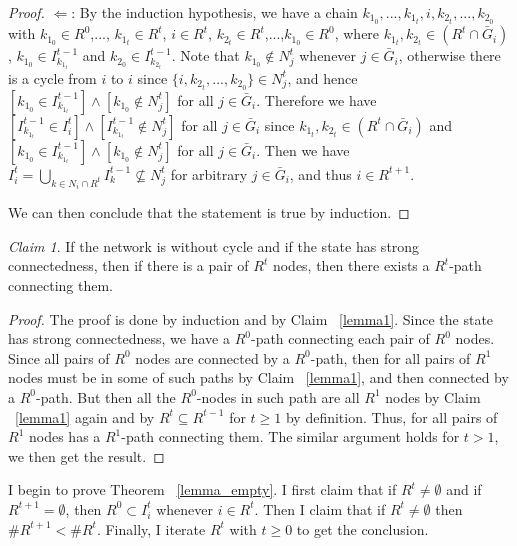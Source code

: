 \documentclass[12pt,letter]{article}
\theoremstyle{definition}
\theoremstyle{remark}
\theoremstyle{claim}
\newtheorem{claim}{Claim}
\begin{document}
\begin{proof}
$\Leftarrow$:
By the induction hypothesis, we have a chain $k_{1_0},...,k_{1_t},i,k_{2_t},...,k_{2_0}$ with $k_{1_0}\in R^0$,..., $k_{1_t}\in R^t$, $i\in R^t$, $k_{2_t}\in R^t$,...,$k_{1_0}\in R^0$, where $k_{1_t},k_{2_t}\in (R^{t}\cap \bar{G}_i)$, $k_{1_0}\in I^{t-1}_{k_{1_t}}$ and $k_{2_0}\in I^{t-1}_{k_{2_t}}$. Note that $k_{1_0}\notin N^t_j$ whenever $j\in \bar{G}_i$, otherwise there is a cycle from $i$ to $i$ since $\{i,k_{2_t},...,k_{2_0}\}\in N^t_j$, and hence $[k_{1_0}\in I^{t-1}_{k_{1_t}}] \wedge [k_{1_0}\notin N^t_j]$ for all $j\in \bar{G}_i$. Therefore we have $[I^{t-1}_{k_{1_t}}\in I^t_i] \wedge [I^{t-1}_{k_{1_t}}\notin N^t_j]$ for all $j\in \bar{G}_i$ since $k_{1_t},k_{2_t}\in (R^{t}\cap \bar{G}_i)$ and $[k_{1_0}\in I^{t-1}_{k_{1_t}}] \wedge [k_{1_0}\notin N^t_j]$ for all $j\in \bar{G}_i$. Then we have $I^t_i=\bigcup_{k\in N_i\cap R^{t}}I^{t-1}_k\nsubseteq N^t_j$ for arbitrary $j\in \bar{G}_i$, and thus $i\in R^{t+1}$.



We can then conclude that the statement is true by induction.




\end{proof}



\begin{claim}
\label{lemma_connected}
If the network  is without cycle and if the state has strong connectedness, then if there is a pair of $R^{t}$ nodes, then there exists a $R^{t}$-path connecting them.
\end{claim}
\begin{proof}
The proof is done by induction and by Claim ~\ref{lemma1}. Since the state has strong connectedness, we have a $R^0$-path connecting each pair of $R^0$ nodes. Since all pairs of $R^0$ nodes are connected by a $R^0$-path, then for all pairs of $R^1$ nodes must be in some of such paths by Claim ~\ref{lemma1}, and then connected by a $R^0$-path. But then all the $R^0$-nodes in such path are all $R^1$ nodes by Claim ~\ref{lemma1} again and by $R^t\subseteq R^{t-1}$ for $t\geq 1$ by definition. Thus, for all pairs of $R^1$ nodes has a $R^1$-path connecting them. The similar argument holds for $t> 1$, we then get the result.

\end{proof}
I begin to prove Theorem ~\ref{lemma_empty}. I first claim that if $R^t\neq \emptyset$ and if $R^{t+1}= \emptyset$, then $R^0\subset I^t_i$ whenever $i\in R^t$. Then I claim that if $R^t\neq \emptyset$ then $\# R^{t+1}<\# R^t$. Finally, I iterate $R^t$ with $t\geq 0$ to get the conclusion.
\end{document}
